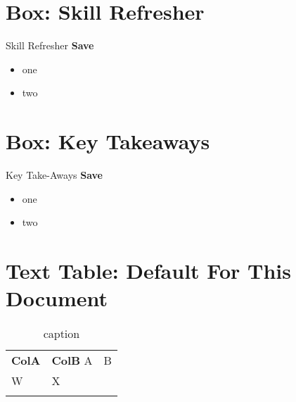 \section{Box: Skill Refresher}
\begin{center}
	\begin{sklbox}{Skill Refresher}
		\textbf{Save}
		\\
		\begin{itemize}
			\setlength{\itemsep}{0pt}
			\setlength{\parskip}{0pt}
			\setlength{\parsep}{0pt}
			
			\item one
			\item two
			
		\end{itemize}
	\end{sklbox}
\end{center}

\section{Box: Key Takeaways}
\begin{center}
	\begin{tkwbox}{Key Take-Aways}
		\textbf{Save}
		\\
		\begin{itemize}
			\setlength{\itemsep}{0pt}
			\setlength{\parskip}{0pt}
			\setlength{\parsep}{0pt}
			
			\item one
			\item two
			
		\end{itemize}
	\end{tkwbox}
\end{center}

\section{Text Table: Default For This Document}
\begin{table}[H]
	{\small
		\begin{longtable}{L{1.0in}L{1.00in}} %
			\textbf{ColA} & \textbf{ColB} \endhead
			\hline
			A & B\\
			W & X\\
			\caption{caption}
			\label{05:tab01}
		\end{longtable}
	} %
\end{table}

